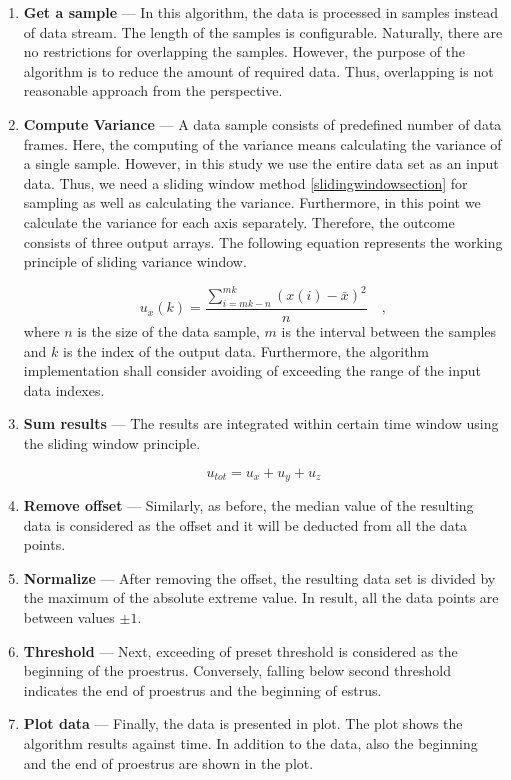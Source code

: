 \documentclass[english,12pt,a4paper,pdftex,elec,utf8]{aaltothesis}
\begin{document}
\begin{enumerate}

\item \textbf{Get a sample} --- In this algorithm, the data is processed in samples instead of data stream. The length of the samples is configurable. Naturally, there are no restrictions for overlapping the samples. However, the purpose of the algorithm is to reduce the amount of required data. Thus, overlapping is not reasonable approach from the perspective.

\item \textbf{Compute Variance} --- A data sample consists of predefined number of data frames. Here, the computing of the variance means calculating the variance of a single sample. However, in this study we use the entire data set as an input data. Thus, we need a sliding window method \ref{slidingwindowsection} for sampling as well as calculating the variance. Furthermore, in this point we calculate the variance for each axis separately. Therefore, the outcome consists of three output arrays. The following equation represents the working principle of sliding variance window.

\begin{equation} \label{samplevariance}
u_x(k) = \frac{\sum \limits_{i=mk-n}^{mk} (x(i) - \bar{x})^2}{n} \mathrm{\hspace{1em},}
\end{equation}
where $n$ is the size of the data sample, $m$ is the interval between the samples and $k$ is the index of the output data. Furthermore, the algorithm implementation shall consider avoiding of exceeding the range of the input data indexes.

\item \textbf{Sum results} --- The results are integrated within certain time window using the sliding window principle.

\begin{equation}
u_{tot} = u_x + u_y + u_z
\end{equation}

\item \textbf{Remove offset} --- Similarly, as before, the median value of the resulting data is considered as the offset and it will be deducted from all the data points.

\item \textbf{Normalize} --- After removing the offset, the resulting data set is divided by the maximum of the absolute extreme value. In result, all the data points are between values $\pm 1$.

\item \textbf{Threshold} --- Next, exceeding of preset threshold is considered as the beginning of the proestrus. Conversely, falling below second threshold indicates the end of proestrus and the beginning of estrus.

\item \textbf{Plot data} --- Finally, the data is presented in plot. The plot shows the algorithm results against time. In addition to the data, also the beginning and the end of proestrus are shown in the plot.

\end{enumerate}
\end{document}
